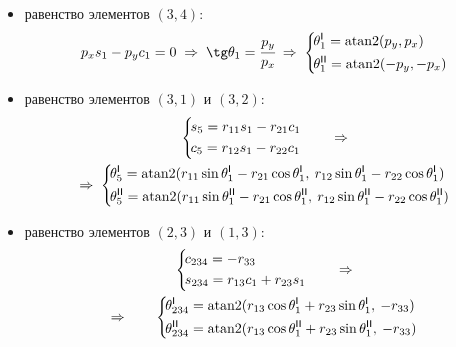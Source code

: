 \begin{itemize}
    \item равенство элементов $(3,4)$:
        \begin{equation}\label{eq_for_theta_1}
	        p_{x} s_{1} - p_{y} c_{1} = 0
            \; \Rightarrow \;
	        \tg \theta_1 = \cfrac{p_y}{p_x}
	        \; \Rightarrow \;
	        \left\{
	        \begin{aligned}
		        \!&\theta_1^\msf{I} = \atan2(p_y, p_x)\\
		        \!&\theta_1^\msf{II} = \atan2(-p_y, -p_x)
            \end{aligned}
            \right.
        \end{equation}
    \item равенство элементов $(3,1)$ и $(3,2)$:
        \begin{multline}
            \left\{
	        \begin{aligned}
		        \!&s_{5} = r_{11} s_{1} - r_{21} c_{1}\\
		        \!&c_{5} = r_{12} s_{1} - r_{22} c_{1}
            \end{aligned}
            \right.
            \qquad \Rightarrow
            \\
            \Rightarrow \;
            \left\{
	        \begin{aligned}
		        \!&\theta_5^\msf{I} = \atan2(r_{11} \sin\theta_1^\msf{I} - r_{21} \cos\theta_1^\msf{I},\: r_{12} \sin\theta_1^\msf{I} - r_{22} \cos\theta_1^\msf{I})\\
		        \!&\theta_5^\msf{II} = \atan2(r_{11} \sin\theta_1^\msf{II} - r_{21} \cos\theta_1^\msf{II},\: r_{12} \sin\theta_1^\msf{II} - r_{22} \cos\theta_1^\msf{II})
            \end{aligned}
            \right.
        \end{multline}
    \item равенство элементов $(2,3)$ и $(1,3)$:
        \begin{multline}
            \left\{
	        \begin{aligned}
		        \!&c_{234} = -r_{33}\\
		        \!&s_{234} = r_{13} c_{1} + r_{23} s_{1}
            \end{aligned}
            \right.
            \qquad \Rightarrow
            \\
            \Rightarrow \qquad
            \left\{
	        \begin{aligned}
		        \!&\theta_{234}^\msf{I} = \atan2(r_{13} \cos\theta_1^\msf{I}  + r_{23} \sin\theta_1^\msf{I},\: -r_{33})\\
		        \!&\theta_{234}^\msf{II} = \atan2(r_{13} \cos\theta_1^\msf{II}  + r_{23} \sin\theta_1^\msf{II},\: -r_{33})
            \end{aligned}
            \right.
        \end{multline}
\end{itemize}

